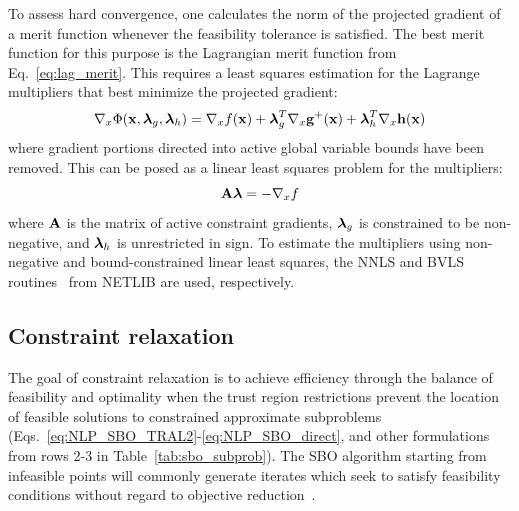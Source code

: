 To assess hard convergence, one calculates the norm of the projected
gradient of a merit function whenever the feasibility tolerance is
satisfied.  The best merit function for this purpose is the Lagrangian
merit function from Eq.~\ref{eq:lag_merit}.  This requires a least
squares estimation for the Lagrange multipliers that best minimize the
projected gradient:
\begin{equation}
\nabla_x \Phi({\bf x}, \mbox{\boldmath $\lambda$}_g, \mbox{\boldmath
$\lambda$}_h) = \nabla_x f({\bf x})
+ \mbox{\boldmath $\lambda$}_g^T \nabla_x {\bf g}^+({\bf x}) +
\mbox{\boldmath $\lambda$}_h^T \nabla_x {\bf h}({\bf x})
\label{eq:lag_merit_grad}
\end{equation}
where gradient portions directed into active global variable bounds
have been removed.  This can be posed as a linear least squares
problem for the multipliers:
\begin{equation}
{\bf A} \mbox{\boldmath $\lambda$} = -\nabla_x f \label{eq:lls_lambda}
\end{equation}
where ${\bf A}$ is the matrix of active constraint gradients,
$\mbox{\boldmath $\lambda$}_g$ is constrained to be non-negative, and
$\mbox{\boldmath $\lambda$}_h$ is unrestricted in sign.  To estimate
the multipliers using non-negative and bound-constrained linear least
squares, the NNLS and BVLS routines~\cite{Law74} from NETLIB are used,
respectively.

\subsection{Constraint relaxation} \label{sbm:sblm_con_relax}


The goal of constraint relaxation is to achieve efficiency through the
balance of feasibility and optimality when the trust region
restrictions prevent the location of feasible solutions to constrained
approximate subproblems
(Eqs.~\ref{eq:NLP_SBO_TRAL2}-\ref{eq:NLP_SBO_direct}, and other
formulations from rows 2-3 in Table~\ref{tab:sbo_subprob}).  The SBO
algorithm starting from infeasible points will commonly generate
iterates which seek to satisfy feasibility conditions without regard
to objective reduction~\cite{Per04b}.

